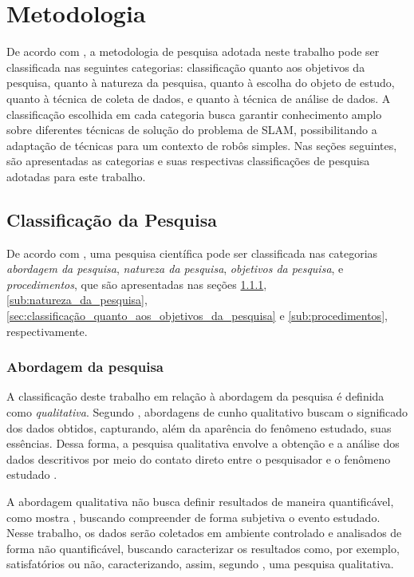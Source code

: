 \chapter[Metodologia]{Metodologia}

	De acordo com \cite{metodologiaCientifica}, a metodologia de pesquisa adotada neste trabalho pode ser classificada nas seguintes categorias: classificação quanto aos objetivos da pesquisa, quanto à natureza da pesquisa, quanto à escolha do objeto de estudo, quanto à técnica de coleta de dados, e quanto à técnica de análise de dados. A classificação escolhida em cada categoria busca garantir conhecimento amplo sobre diferentes técnicas de solução do problema de SLAM, possibilitando a adaptação de técnicas para um contexto de robôs simples. Nas seções seguintes, são apresentadas as categorias e suas respectivas classificações de pesquisa adotadas para este trabalho. 

	\section{Classificação da Pesquisa} %
	\label{sec:classificação_da_pesquisa}
		
		De acordo com \cite{metodologia}, uma pesquisa científica pode ser classificada nas categorias \textit{abordagem da pesquisa}, \textit{natureza da pesquisa}, \textit{objetivos da pesquisa}, e \textit{procedimentos}, que são apresentadas nas seções \ref{sub:abordagem_da_pesquisa}, \ref{sub:natureza_da_pesquisa}, \ref{sec:classificação_quanto_aos_objetivos_da_pesquisa} e \ref{sub:procedimentos}, respectivamente.



		\subsection{Abordagem da pesquisa} %
		\label{sub:abordagem_da_pesquisa}

			A classificação deste trabalho em relação à abordagem da pesquisa é definida como \textit{qualitativa}. Segundo \cite{metodologiaCientifica}, abordagens de cunho qualitativo buscam o significado dos dados obtidos, capturando, além da aparência do fenômeno estudado, suas essências. Dessa forma, a pesquisa qualitativa envolve a obtenção e a análise dos dados descritivos por meio do contato direto entre o pesquisador e o fenômeno estudado \cite{metodologiaCientifica}. 

			A abordagem qualitativa não busca definir resultados de maneira quantificável, como mostra \cite{metodologia}, buscando compreender de forma subjetiva o evento estudado. Nesse trabalho, os dados serão coletados em ambiente controlado e analisados de forma não quantificável, buscando caracterizar os resultados como, por exemplo, satisfatórios ou não, caracterizando, assim, segundo \cite{metodologia}, uma pesquisa qualitativa.

